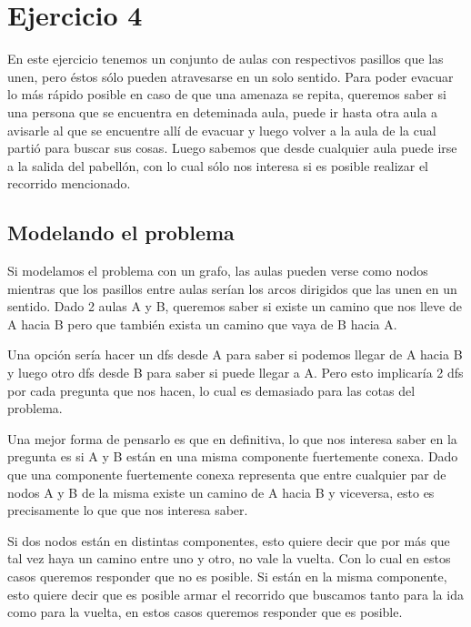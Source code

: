 \section{Ejercicio 4}

En este ejercicio tenemos un conjunto de aulas con respectivos pasillos que las unen, pero éstos sólo pueden atravesarse en un solo sentido. Para poder evacuar lo más rápido posible en caso de que una amenaza se repita, queremos saber si una persona que se encuentra en deteminada aula, puede ir hasta otra aula a avisarle al que se encuentre allí de evacuar y luego volver a la aula de la cual partió para buscar sus cosas. Luego sabemos que desde cualquier aula puede irse a la salida del pabellón, con lo cual sólo nos interesa si es posible realizar el recorrido mencionado. 


\subsection{Modelando el problema}

Si modelamos el problema con un grafo, las aulas pueden verse como nodos mientras que los pasillos entre aulas serían los arcos dirigidos que las unen en un sentido. Dado 2 aulas A y B, queremos saber si existe un camino que nos lleve de A hacia B pero que también exista un camino que vaya de B hacia A. \newline

Una opción sería hacer un dfs desde A para saber si podemos llegar de A hacia B y luego otro dfs desde B para saber si puede llegar a A. Pero esto implicaría 2 dfs por cada pregunta que nos hacen, lo cual es demasiado para las cotas del problema. \newline

Una mejor forma de pensarlo es que en definitiva, lo que nos interesa saber en la pregunta es si A y B están en una misma componente fuertemente conexa. Dado que una componente fuertemente conexa representa que entre cualquier par de nodos A y B de la misma existe un camino de A hacia B y viceversa, esto es precisamente lo que que nos interesa saber.  \newline

Si dos nodos están en distintas componentes, esto quiere decir que por más que tal vez haya un camino entre uno y otro, no vale la vuelta. Con lo cual en estos casos queremos responder que no es posible. Si están en la misma componente, esto quiere decir que es posible armar el recorrido que buscamos tanto para la ida como para la vuelta, en estos casos queremos responder que es posible.\newline

